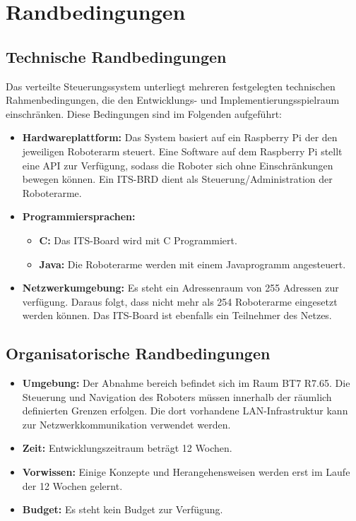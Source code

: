 

\chapter{Randbedingungen}

\section{Technische Randbedingungen}

Das verteilte Steuerungssystem unterliegt mehreren festgelegten technischen Rahmenbedingungen, die den Entwicklungs- und Implementierungsspielraum einschränken. Diese Bedingungen sind im Folgenden aufgeführt:

\begin{itemize}
    \item \textbf{Hardwareplattform:}  Das System basiert auf ein Raspberry Pi der den jeweiligen Roboterarm steuert. Eine Software auf dem Raspberry Pi stellt eine API zur Verfügung, sodass die Roboter sich ohne Einschränkungen bewegen können. %
     Ein ITS-BRD dient als Steuerung/Administration der Roboterarme.
    
    \item \textbf{Programmiersprachen:}  
    \begin{itemize}
        \item \textbf{C:} Das ITS-Board wird mit C Programmiert. 
        \item \textbf{Java:} Die Roboterarme werden mit einem Javaprogramm angesteuert.
    \end{itemize}
    \item \textbf{Netzwerkumgebung:} Es steht ein Adressenraum von 255 Adressen zur verfügung. Daraus folgt, dass nicht mehr als 254 Roboterarme eingesetzt werden können. Das ITS-Board ist ebenfalls ein Teilnehmer des Netzes.

    
\end{itemize}

\section{Organisatorische Randbedingungen}
\begin{itemize}

    \item \textbf{Umgebung:}  
    Der Abnahme bereich befindet sich im Raum BT7 R7.65. Die Steuerung und Navigation des Roboters müssen innerhalb der räumlich definierten Grenzen erfolgen. Die dort vorhandene LAN-Infrastruktur kann zur Netzwerkkommunikation verwendet werden.
    \item \textbf{Zeit:} Entwicklungszeitraum beträgt 12 Wochen. 
    \item \textbf{Vorwissen:} Einige Konzepte und Herangehensweisen werden erst im Laufe der 12 Wochen gelernt.
    \item \textbf{Budget:} Es steht kein Budget zur Verfügung.

\end{itemize}

